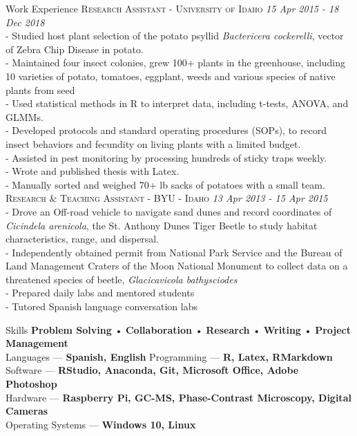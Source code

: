 \documentclass{resume} %
\begin{document}
\begin{rSection}{Work Experience}
\textsc{Research Assistant - University of Idaho} \hfill {\em \textit{15 Apr 2015 - 18 Dec 2018}}\\
- Studied host plant selection of the potato psyllid \textit{Bactericera cockerelli}, vector of Zebra Chip Disease in potato.\\
- Maintained four insect colonies, grew 100+ plants in the greenhouse, including 10 varieties of potato, tomatoes, eggplant, weeds and various species of native plants from seed\\
- Used statistical methods in R to interpret data, including t-tests, ANOVA, and GLMMs.\\
- Developed protocols and standard operating procedures (SOPs), to record insect behaviors and fecundity on living plants with a limited budget.\\
- Assisted in pest monitoring by processing hundreds of sticky traps weekly.\\
- Wrote and published thesis with Latex.\\
- Manually sorted and weighed 70+ lb sacks of potatoes with a small team.\\

\textsc{Research \& Teaching Assistant - BYU - Idaho} \hfill {\em \textit{13 Apr 2013 - 15 Apr 2015}}\\
- Drove an Off-road vehicle to navigate sand dunes and record coordinates of \textit{Cicindela arenicola}, the St. Anthony Dunes Tiger Beetle to study habitat characteristics, range, and dispersal.\\
- Independently obtained permit from National Park Service and the Bureau of Land Management Craters of the Moon National Monument to collect data on a threatened species of beetle, \textit{Glacicavicola bathysciodes}\\
- Prepared daily labs and mentored students\\
- Tutored Spanish language conversation labs\\
	\hfill
\end{rSection}


\begin{rSection}{Skills}
\textbf{Problem Solving} • \textbf{Collaboration} • \textbf{Research} • \textbf{Writing} • \textbf{Project Management}\\
Languages --- \textbf{Spanish, English} \hfill Programming --- \textbf{R, Latex, RMarkdown}\\   
Software --- \textbf{RStudio, Anaconda, Git, Microsoft Office, Adobe Photoshop}\\
Hardware --- \textbf{Raspberry Pi, GC-MS, Phase-Contrast Microscopy, Digital Cameras}\\
Operating Systems --- \textbf{Windows 10, Linux}
\end{rSection}
\end{document}
